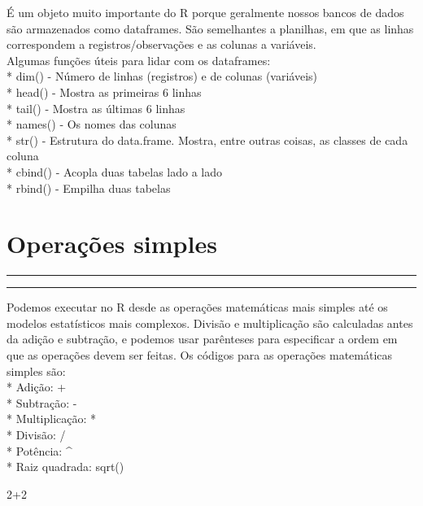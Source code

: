 \documentclass[
  letterpaper,
  DIV=11,
  numbers=noendperiod]{scrreprt}
\newenvironment{Shaded}{\begin{snugshade}}{\end{snugshade}}
\newcommand{\DecValTok}[1]{\textcolor[rgb]{0.68,0.00,0.00}{#1}}
\newcommand{\SpecialCharTok}[1]{\textcolor[rgb]{0.37,0.37,0.37}{#1}}
\begin{document}
É um objeto muito importante do R porque geralmente nossos bancos de
dados são armazenados como dataframes. São semelhantes a planilhas, em
que as linhas correspondem a registros/observações e as colunas a
variáveis.\\
Algumas funções úteis para lidar com os dataframes:\\
* dim() - Número de linhas (registros) e de colunas (variáveis)\\
* head() - Mostra as primeiras 6 linhas\\
* tail() - Mostra as últimas 6 linhas\\
* names() - Os nomes das colunas\\
* str() - Estrutura do data.frame. Mostra, entre outras coisas, as
classes de cada coluna\\
* cbind() - Acopla duas tabelas lado a lado\\
* rbind() - Empilha duas tabelas


\chapter{Operações simples}\label{operauxe7uxf5es-simples}

\begin{center}\rule{0.5\linewidth}{0.5pt}\end{center}

\begin{center}\rule{0.5\linewidth}{0.5pt}\end{center}

Podemos executar no R desde as operações matemáticas mais simples até os
modelos estatísticos mais complexos. Divisão e multiplicação são
calculadas antes da adição e subtração, e podemos usar parênteses para
especificar a ordem em que as operações devem ser feitas. Os códigos
para as operações matemáticas simples são:\\
* Adição: +\\
* Subtração: -\\
* Multiplicação: *\\
* Divisão: /\\
* Potência: \^{}\\
* Raiz quadrada: sqrt()

\begin{Shaded}
\begin{Highlighting}[]
\DecValTok{2}\SpecialCharTok{+}\DecValTok{2}
\end{Highlighting}
\end{Shaded}
\end{document}

